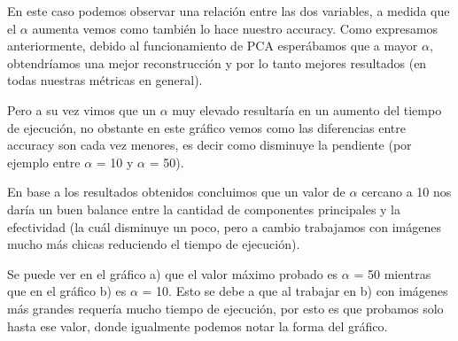 En este caso podemos observar una relación entre las dos variables, a medida que el $\alpha$ aumenta vemos como también lo hace nuestro accuracy.
Como expresamos anteriormente, debido al funcionamiento de PCA esperábamos que a mayor $\alpha$, obtendríamos una mejor reconstrucción y por lo tanto mejores resultados (en todas nuestras métricas en general).

Pero a su vez vimos que un $\alpha$ muy elevado resultaría en un aumento del tiempo de ejecución, no obstante en este gráfico vemos como las diferencias entre accuracy son cada vez menores, es decir como disminuye la pendiente (por ejemplo entre $\alpha$ = 10 y $\alpha$ = 50).

En base a los resultados obtenidos concluimos que un valor de $\alpha$ cercano a 10 nos daría un buen balance entre la cantidad de componentes principales y la efectividad (la cuál disminuye un poco, pero a cambio trabajamos con imágenes mucho más chicas reduciendo el tiempo de ejecución).

Se puede ver en el gráfico a) que el valor máximo probado es $\alpha$ = 50 mientras que en el gráfico b) es $\alpha$ = 10. Esto se debe a que al trabajar en b) con imágenes más grandes requería mucho tiempo de ejecución, por esto es que probamos solo hasta ese valor, donde igualmente podemos notar la forma del gráfico. 

